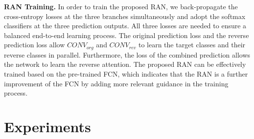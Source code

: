 \documentclass[runningheads]{llncs}
\begin{document}
{\bf RAN Training.} In order to train the proposed RAN, we
back-propagate the cross-entropy losses at the three branches
simultaneously and adopt the softmax classifiers at the three prediction
outputs.  All three losses are needed to ensure a balanced end-to-end
learning process. The original prediction loss and the reverse
prediction loss allow $CONV_{org}$ and $CONV_{rev}$ to learn the target classes
and their reverse classes in parallel. Furthermore, the loss of the
combined prediction allows the network to learn the reverse attention.
The proposed RAN can be effectively trained based on the pre-trained
FCN, which indicates that the RAN is a further improvement of the FCN by
adding more relevant guidance in the training process.

\section{Experiments}
\begin{table*}[t]
\begin{center}
\end{center}
\caption{Comparison of semantic image segmentation performance scores ($\%$) 
on the 5,105 test images of the PASCAL Context dataset.}\label{tab:context}
\end{table*}
\end{document}
